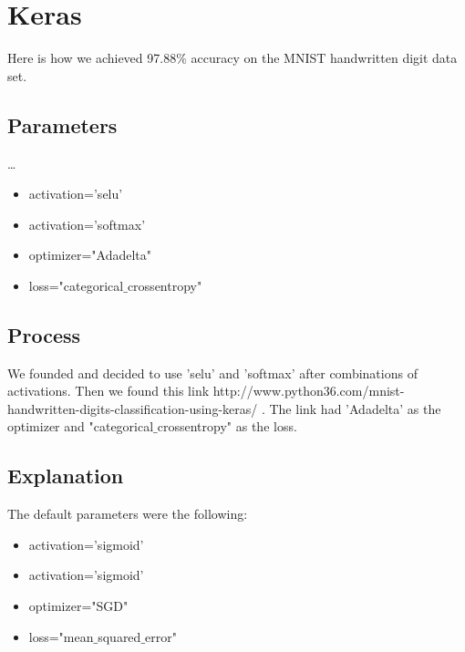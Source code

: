 \documentclass[11pt]{article}
\begin{document}
\section{Keras}

Here is how we achieved 97.88{\%} %
accuracy on the MNIST handwritten digit data set.

\subsection{Parameters}

\ldots
\begin{itemize}
 \item activation='selu'
 \item activation='softmax'
 \item optimizer="Adadelta"
 \item loss="categorical$\_$crossentropy"
\end{itemize}

\subsection{Process}
We founded and decided to use 'selu' and 'softmax' after combinations of activations. Then we found this link http://www.python36.com/mnist-handwritten-digits-classification-using-keras/ .
The link had 'Adadelta' as the optimizer and "categorical$\_$crossentropy" as the loss.
\subsection{Explanation}
The default parameters were the following:
\begin{itemize}
 \item activation='sigmoid'
 \item activation='sigmoid'
 \item optimizer="SGD"
 \item loss="mean$\_$squared$\_$error"
\end{itemize}
\end{document}
